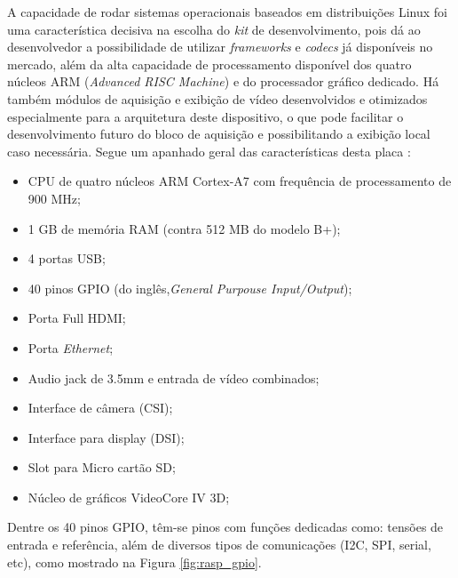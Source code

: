 A capacidade de rodar sistemas operacionais baseados em distribuições Linux foi uma característica decisiva na escolha do \textit{kit} de desenvolvimento, pois dá ao desenvolvedor a possibilidade de utilizar \textit{frameworks} e \textit{codecs} já disponíveis no mercado, além da alta capacidade de processamento disponível dos quatro núcleos ARM (\textit{Advanced RISC Machine}) e do processador gráfico dedicado. Há também módulos de aquisição e exibição de vídeo desenvolvidos e otimizados especialmente para a arquitetura deste dispositivo, o que pode facilitar o desenvolvimento futuro do bloco de aquisição e possibilitando a exibição local caso necessária. Segue um apanhado geral das características desta placa  \cite{raspberryOrg} :
\begin{itemize}
\item CPU de quatro núcleos ARM Cortex-A7 com frequência de processamento de 900 MHz;
\item  1 GB de memória RAM (contra 512 MB do modelo B+);
\item 4 portas USB;
\item 40 pinos GPIO (do inglês,\textit{General Purpouse Input/Output});
\item Porta Full HDMI;
\item Porta \textit{Ethernet};
\item Audio jack de 3.5mm e entrada de vídeo combinados;
\item Interface de câmera (CSI);
\item Interface para display (DSI);
\item Slot para Micro cartão SD;
\item Núcleo de gráficos VideoCore IV 3D;
\end{itemize}

Dentre os 40 pinos GPIO, têm-se pinos com funções dedicadas como: tensões de entrada e referência, além de diversos tipos de comunicações (I2C, SPI, serial, etc), como mostrado na Figura \ref{fig:rasp_gpio}.

